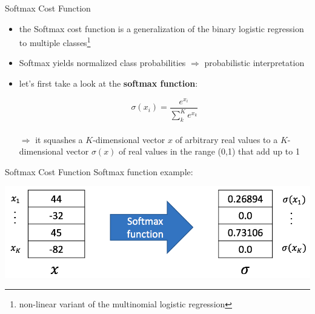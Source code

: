 \documentclass{beamer}
\begin{document}
\begin{frame}{Softmax Cost Function}
\begin{itemize}
\item the Softmax cost function is a generalization of the binary logistic regression to multiple classes\footnote{non-linear variant of the multinomial logistic regression}
\item Softmax yields normalized class probabilities $\Rightarrow$ probabilistic interpretation
\item let's first take a look at the \textbf{softmax function}: 

\begin{equation}
    \sigma(x_i) = \frac{e^{x_i}}{\sum_{k}^K e^{x_k}}
\end{equation}\\
$\Rightarrow$ it squashes a $K$-dimensional vector $x$ of arbitrary real values to a $K$-dimensional vector $\sigma(x)$ of real values in the range (0,1) that add up to 1
\end{itemize}
\end{frame}

\begin{frame}{Softmax Cost Function}
Softmax function example:
\begin{center}
\includegraphics[width=1\textwidth]{softmax_function_example}
\end{center}
\end{frame}
\end{document}

